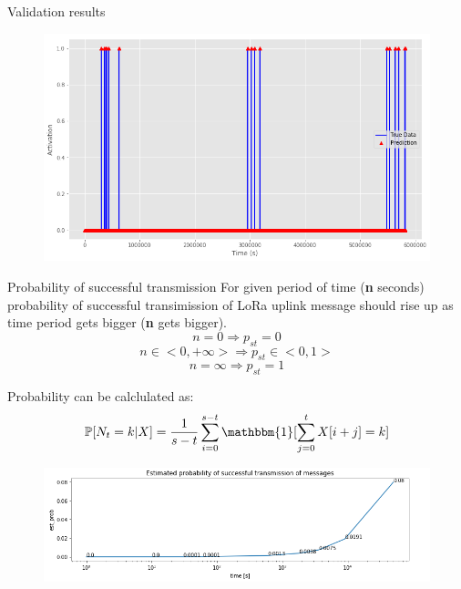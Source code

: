 \documentclass{beamer}
\begin{document}
  \begin{frame}{Validation results}
    \begin{figure}[]
      \centering
      \includegraphics[width=\linewidth]{images/lstm-out.png}
    \end{figure}
  \end{frame}

  \begin{frame}{Probability of successful transmission}
    For given period of time (\textbf{n} seconds) probability of successful transimission of LoRa uplink message should rise up as time period gets bigger (\textbf{n} gets bigger). 
    $$ n = 0 \Rightarrow p_{st} = 0 $$ 
    $$ n \in <0, +\infty> \Rightarrow p_{st} \in <0, 1> $$
    $$ n = \infty \Rightarrow p_{st} = 1 $$

    Probability can be calclulated as: 
    $$ \mathbb{P}[N_{t} = k | X] =  \frac{1}{s-t}  \sum_{i=0}^{s-t}\mathbbm{1}[\sum_{j=0}^{t}X[i+j]=k] $$
  \end{frame}

  \begin{frame}
    \begin{figure}[]
      \centering
      \includegraphics[width=\linewidth]{images/est-prob.png}
    \end{figure}
  \end{frame}
\end{document}
